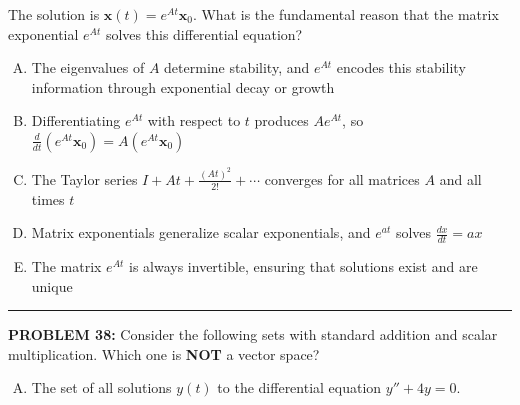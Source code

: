 \documentclass[12pt]{amsart}
\newcommand{\divider}{
  \vspace{-1em} %
  \noindent
  \raisebox{-0.15ex}{\textbullet}%
  \hspace{0.5em}%
  \rule[0.5ex]{0.95\textwidth}{1.0pt}%
  \hspace{0.5em}%
  \raisebox{-0.15ex}{\textbullet}%
  \vspace{0em} %
}
\begin{document}
{The solution is $\mathbf{x}(t) = e^{At}\mathbf{x}_0$. What is the fundamental reason that the matrix exponential $e^{At}$ solves this differential equation?

\begin{enumerate}[(A)]
\item The eigenvalues of $A$ determine stability, and $e^{At}$ encodes this stability information through exponential decay or growth
\item Differentiating $e^{At}$ with respect to $t$ produces $Ae^{At}$, so $\frac{d}{dt}(e^{At}\mathbf{x}_0) = A(e^{At}\mathbf{x}_0)$
\item The Taylor series $I + At + \frac{(At)^2}{2!} + \cdots$ converges for all matrices $A$ and all times $t$
\item Matrix exponentials generalize scalar exponentials, and $e^{at}$ solves $\frac{dx}{dt} = ax$
\item The matrix $e^{At}$ is always invertible, ensuring that solutions exist and are unique
\end{enumerate}


\divider


\newpage


{\bf PROBLEM 38:}
% 
Consider the following sets with standard addition and scalar multiplication. 
Which one is \textbf{NOT} a vector space?

\begin{enumerate}[(A)]
\item The set of all solutions $y(t)$ to the differential equation $y'' + 4y = 0$.


\end{enumerate}}
\end{document}
